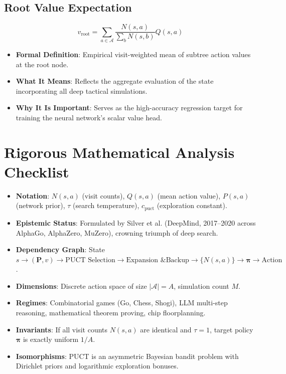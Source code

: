 \documentclass[11pt,a4paper]{article}
\theoremstyle{definition}
\begin{document}
\subsection{Root Value Expectation}
{\boldmath
\begin{equation}
v_{\text{root}} = \sum_{a \in \mathcal{A}} \frac{N(s, a)}{\sum_b N(s, b)} Q(s, a)
\end{equation}
}
\begin{itemize}
    \item \textbf{Formal Definition}: Empirical visit-weighted mean of subtree action values at the root node.
    \item \textbf{What It Means}: Reflects the aggregate evaluation of the state incorporating all deep tactical simulations.
    \item \textbf{Why It Is Important}: Serves as the high-accuracy regression target for training the neural network's scalar value head.
\end{itemize}

\section{Rigorous Mathematical Analysis Checklist}

\begin{itemize}
    \item \textbf{Notation}: $N(s, a)$ (visit counts), $Q(s, a)$ (mean action value), $P(s, a)$ (network prior), $\tau$ (search temperature), $c_{\text{puct}}$ (exploration constant).
    \item \textbf{Epistemic Status}: Formulated by Silver et al. (DeepMind, 2017--2020 across AlphaGo, AlphaZero, MuZero), crowning triumph of deep search.
    \item \textbf{Dependency Graph}: State $s \to (\mathbf{P}, v) \to \text{PUCT Selection} \to \text{Expansion \& Backup} \to \{N(s, a)\} \to \boldsymbol{\pi} \to \text{Action}$.
    \item \textbf{Dimensions}: Discrete action space of size $|\mathcal{A}| = A$, simulation count $M$.
    \item \textbf{Regimes}: Combinatorial games (Go, Chess, Shogi), LLM multi-step reasoning, mathematical theorem proving, chip floorplanning.
    \item \textbf{Invariants}: If all visit counts $N(s, a)$ are identical and $\tau = 1$, target policy $\boldsymbol{\pi}$ is exactly uniform $1/A$.
    \item \textbf{Isomorphisms}: PUCT is an asymmetric Bayesian bandit problem with Dirichlet priors and logarithmic exploration bonuses.
\end{itemize}
\end{document}
